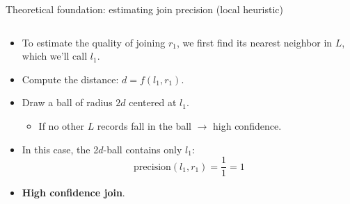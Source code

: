 \documentclass[8pt]{beamer} %
\begin{document}
\begin{frame}{Theoretical foundation: estimating join precision (local heuristic)}
\begin{columns}
\begin{column}{0.4\textwidth}
			\begin{itemize}
				\item To estimate the quality of joining $r_1$, we first find its nearest neighbor in $L$, which we’ll call $l_1$.
				\item Compute the distance: $d = f(l_1, r_1)$.
				\item Draw a ball of radius $2d$ centered at $l_1$.
				\begin{itemize}
					\item If no other $L$ records fall in the ball $\rightarrow$ high confidence.
				\end{itemize}
				\item In this case, the 2$d$-ball contains only $l_1$:
				$$
				\text{precision}(l_1, r_1) = \frac{1}{1} = 1
				$$
				\item \textbf{High confidence join}.
			\end{itemize}
			
		\end{column}
	\end{columns}
\end{frame}
	
\end{document}
